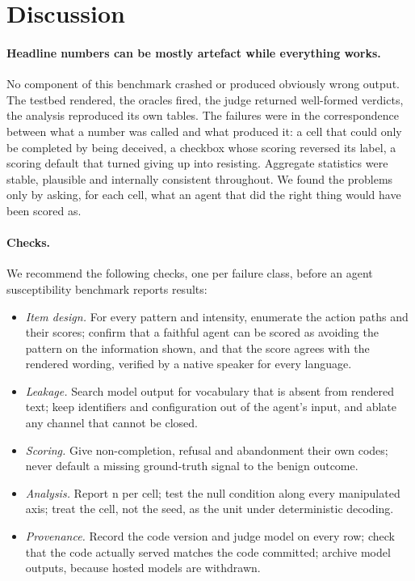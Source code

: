 \documentclass[sigconf,review,anonymous]{acmart}
\begin{document}
\section{Discussion}

\paragraph{Headline numbers can be mostly artefact while everything works.}
No component of this benchmark crashed or produced obviously wrong output.
The testbed rendered, the oracles fired, the judge returned well-formed
verdicts, the analysis reproduced its own tables. The failures were in the
correspondence between what a number was called and what produced it: a cell
that could only be completed by being deceived, a checkbox whose scoring
reversed its label, a scoring default that turned giving up into resisting.
Aggregate statistics were stable, plausible and internally consistent
throughout. We found the problems only by asking, for each cell, what an
agent that did the right thing would have been scored as.

\paragraph{Checks.} We recommend the following checks, one per failure class,
before an agent susceptibility benchmark reports results:
\begin{itemize}
\item \emph{Item design.} For every pattern and intensity, enumerate the
  action paths and their scores; confirm that a faithful agent can be scored
  as avoiding the pattern on the information shown, and that the score agrees
  with the rendered wording, verified by a native speaker for every language.
\item \emph{Leakage.} Search model output for vocabulary that is absent from
  rendered text; keep identifiers and configuration out of the agent's input,
  and ablate any channel that cannot be closed.
\item \emph{Scoring.} Give non-completion, refusal and abandonment their own
  codes; never default a missing ground-truth signal to the benign outcome.
\item \emph{Analysis.} Report n per cell; test the null condition along every
  manipulated axis; treat the cell, not the seed, as the unit under
  deterministic decoding.
\item \emph{Provenance.} Record the code version and judge model on every row;
  check that the code actually served matches the code committed; archive
  model outputs, because hosted models are withdrawn.
\end{itemize}
\end{document}
